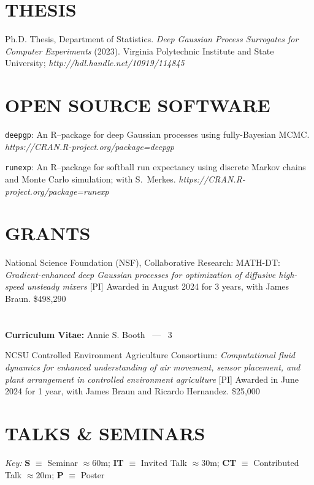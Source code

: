 \documentclass[margin,line,11pt]{res}
\begin{document}
\begin{resume}
\medskip
\section{\bf THESIS}

Ph.D. Thesis, Department of Statistics.  {\it Deep Gaussian Process
Surrogates for Computer Experiments} (2023). Virginia Polytechnic Institute
and State University; {\it http://hdl.handle.net/10919/114845}

\medskip
\section{\bf OPEN SOURCE SOFTWARE}

{\tt deepgp}: An {\sf R}--package for deep Gaussian processes 
using fully-Bayesian MCMC.\\
{\sl https://CRAN.R-project.org/package=deepgp}

{\tt runexp}: An {\sf R}--package for softball run expectancy using 
discrete Markov chains and Monte Carlo simulation; with S.~Merkes.
{\sl https://CRAN.R-project.org/package=runexp}

\medskip
\section{\bf GRANTS}

National Science Foundation (NSF), Collaborative Research: MATH-DT: {\it Gradient-enhanced
deep Gaussian processes for optimization of diffusive high-speed unsteady mixers} [PI]
Awarded in August 2024 for 3 years, with James Braun.  \hspace*{\fill} \$498,290

\pagebreak
\section{}
\hfill {\bf Curriculum Vitae:} Annie S. Booth \  --- \  3
\medskip

NCSU Controlled Environment Agriculture Consortium: {\it Computational fluid dynamics for
enhanced understanding of air movement, sensor placement, and plant arrangement in controlled
environment agriculture} [PI] Awarded in June 2024 for 1 year, with James Braun and 
Ricardo Hernandez. \hspace*{\fill} \$25,000

\medskip
\section{\bf TALKS \& SEMINARS}
{\em Key:}
{\bf S} $\equiv$ Seminar $\approx60$m;
{\bf IT} $\equiv$ Invited Talk $\approx30$m;
{\bf CT} $\equiv$ Contributed Talk $\approx20$m; 
{\bf P} $\equiv$ Poster %


\end{resume}
\end{document}
